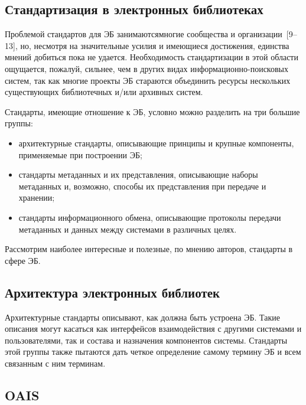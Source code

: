 \begin{multicols}{2}
\section{Стандартизация в электронных библиотеках}
  
  Проблемой стандартов для ЭБ занимаются\linebreak многие сообщества и 
  организации~[9--13], но, несмот\-ря на значительные усилия и имеющиеся 
достижения, единства мнений добиться пока не удается. Необходимость стандартизации в 
этой об\-ласти ощущается, пожалуй, сильнее, чем в других видах информационно-поисковых 
систем, так как многие проекты ЭБ стараются объединить ресурсы нескольких 
существующих библиотечных и/или архивных систем.
  
  Стандарты, имеющие отношение к ЭБ, условно можно разделить на три большие группы: 
  \begin{itemize}
\item архитектурные стандарты, описывающие принципы и крупные компоненты, 
применяемые при построении ЭБ;\\[-14pt]
\item стандарты метаданных и их представления, описывающие наборы метаданных и, 
возможно, способы их представления при передаче и хранении;\\[-14pt]
\item стандарты информационного обмена, описывающие протоколы передачи метаданных 
и данных между системами в различных целях.
\end{itemize}

  Рассмотрим наиболее интересные и полезные, по мнению авторов, стандарты в сфере ЭБ.
  
\vspace*{-6pt}
  
\subsection{Архитектура электронных библиотек}
  
  Архитектурные стандарты описывают, как должна быть устроена ЭБ. Такие описания 
могут касаться как интерфейсов взаимодействия с другими системами и пользователями, так 
и состава и назначения компонентов системы.  Стандарты этой группы также пытаются дать 
четкое определение самому термину ЭБ и всем связанным с ним терминам.

\vspace*{-12pt}

  \subsection*{OAIS}
  

\end{multicols}
